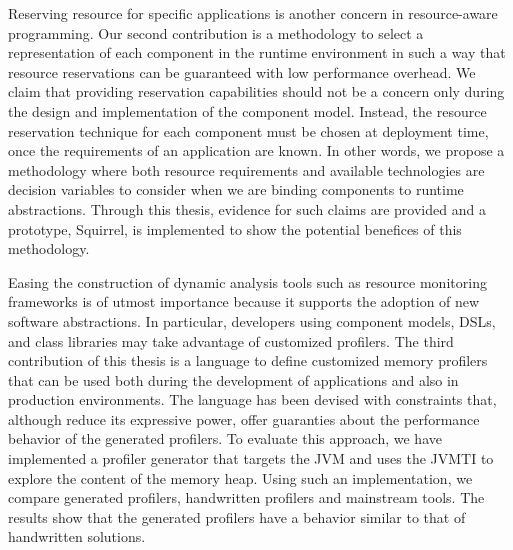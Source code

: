 Reserving resource for specific applications is another concern in resource-aware programming.
Our second contribution is a methodology to select a representation of each component in the runtime environment in such a way that resource reservations can be guaranteed with low performance overhead.
We claim that providing reservation capabilities should not be a concern only during the design and implementation of the component model.
Instead, the resource reservation technique for each component must be chosen at deployment time, once the requirements of an application are known.
In other words, we propose a methodology where both resource requirements and available technologies are decision variables to consider when we are binding components to runtime abstractions.
Through this thesis, evidence for such claims are provided and a prototype, Squirrel, is implemented to show the potential benefices of this methodology.


Easing the construction of dynamic analysis tools such as resource monitoring frameworks is of utmost importance because it supports the adoption of new software abstractions.
In particular, developers using component models, DSLs, and class libraries may take advantage of customized profilers.
The third contribution of this thesis is a language to define customized memory profilers that can be used both during the development of applications and also in production environments.
The language has been devised with constraints that, although reduce its expressive power, offer guaranties about the performance behavior of the generated profilers.
To evaluate this approach, we have implemented a profiler generator that targets the JVM and uses the JVMTI to explore the content of the memory heap.
Using such an implementation, we compare generated profilers, handwritten profilers and mainstream tools.
The results show that the generated profilers have a behavior similar to that of handwritten solutions.

